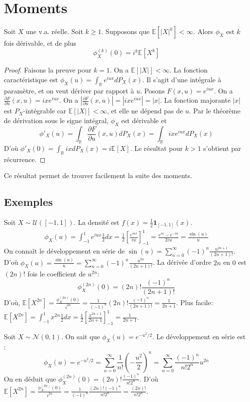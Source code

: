 \section{Moments}
\begin{proposition}
Soit $X$ une v.a. réelle. Soit $k \geq 1$. Supposons que $\mathbb{E}[|X|^k] < \infty$.
Alors $\phi_X$ est $k$ fois dérivable, et de plus
\[ \phi_X^{(k)}(0) = i^k \mathbb{E}[X^k] \]
\end{proposition}
\begin{proof}
Faisons la preuve pour $k=1$. On a $\mathbb{E}[|X|] < \infty$.
La fonction caractéristique est $\phi_X(u) = \int_{\mathbb{R}} e^{iux} dP_X(x)$.
Il s'agit d'une intégrale à paramètre, et on veut dériver par rapport à $u$.
Posons $F(x,u) = e^{iux}$. On a $\frac{\partial F}{\partial u}(x,u) = ix e^{iux}$.
On a $\left|\frac{\partial F}{\partial u}(x,u)\right| = |ix e^{iux}| = |x|$.
La fonction majorante $|x|$ est $P_X$-intégrable car $\mathbb{E}[|X|] < \infty$, et elle ne dépend pas de $u$.
Par le théorème de dérivation sous le signe intégral, $\phi_X$ est dérivable et
\[ \phi'_X(u) = \int_{\mathbb{R}} \frac{\partial F}{\partial u}(x,u) dP_X(x) = \int_{\mathbb{R}} ix e^{iux} dP_X(x) \]
D'où $\phi'_X(0) = \int_{\mathbb{R}} ix dP_X(x) = i \mathbb{E}[X]$.
Le résultat pour $k > 1$ s'obtient par récurrence.
\end{proof}
Ce résultat permet de trouver facilement la suite des moments.
\subsection*{Exemples}
\begin{example}
Soit $X \sim \mathcal{U}([-1,1])$. La densité est $f(x) = \frac{1}{2} \mathbf{1}_{[-1,1]}(x)$.
\begin{align*}
    \phi_X(u) = \int_{-1}^1 e^{iux} \frac{1}{2} dx = \frac{1}{2} \left[ \frac{e^{iux}}{iu} \right]_{-1}^1 = \frac{e^{iu} - e^{-iu}}{2iu} = \frac{\sin(u)}{u}
\end{align*}
On connaît le développement en série de $\sin(u) = \sum_{n=0}^\infty (-1)^n \frac{u^{2n+1}}{(2n+1)!}$.
D'où $\phi_X(u) = \frac{\sin(u)}{u} = \sum_{n=0}^\infty (-1)^n \frac{u^{2n}}{(2n+1)!}$.
La dérivée d'ordre $2n$ en $0$ est $(2n)!$ fois le coefficient de $u^{2n}$:
\[ \phi_X^{(2n)}(0) = (2n)! \frac{(-1)^n}{(2n+1)!} \]
D'où, $\mathbb{E}[X^{2n}] = \frac{\phi_X^{(2n)}(0)}{i^{2n}} = \frac{1}{(-1)^n} (2n)! \frac{(-1)^n}{(2n+1)!} = \frac{1}{2n+1}$.
Plus facile: $\mathbb{E}[X^{2n}] = \int_{-1}^1 x^{2n} \frac{1}{2} dx = \frac{1}{2} \left[ \frac{x^{2n+1}}{2n+1} \right]_{-1}^1 = \frac{1}{2n+1}$.
\end{example}
\begin{example}
Soit $X \sim \mathcal{N}(0,1)$. On sait que $\phi_X(u) = e^{-u^2/2}$.
Le développement en série est :
\[ \phi_X(u) = e^{-u^2/2} = \sum_{n=0}^\infty \frac{1}{n!} \left( -\frac{u^2}{2} \right)^n = \sum_{n=0}^\infty \frac{(-1)^n}{n! 2^n} u^{2n} \]
On en déduit que $\phi_X^{(2n)}(0) = (2n)! \frac{(-1)^n}{n! 2^n}$.
D'où $\mathbb{E}[X^{2n}] = \frac{\phi_X^{(2n)}(0)}{i^{2n}} = \frac{1}{(-1)^n} \frac{(2n)! (-1)^n}{n! 2^n} = \frac{(2n)!}{n! 2^n}$.
\end{example}
